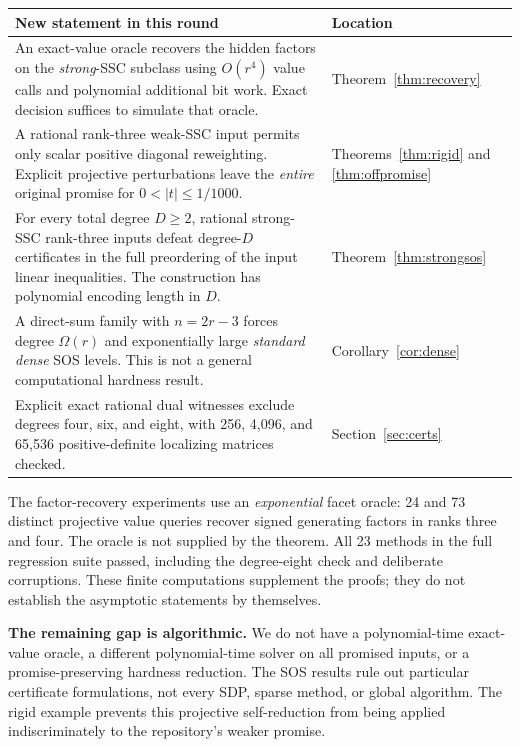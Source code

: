 \documentclass[11pt]{article}
\theoremstyle{definition}\newtheorem{definition}[theorem]{Definition}
\begin{document}
\begin{center}
\begin{tabular}{p{}p{}}
\toprule
\textbf{New statement in this round} & \textbf{Location}\\
\midrule
An exact-value oracle recovers the hidden factors on the \emph{strong}-SSC subclass using $O(r^4)$ value calls and polynomial additional bit work. Exact decision suffices to simulate that oracle. & Theorem~\ref{thm:recovery}\\[5pt]
A rational rank-three weak-SSC input permits only scalar positive diagonal reweighting. Explicit projective perturbations leave the \emph{entire} original promise for $0<|t|\le1/1000$. & Theorems~\ref{thm:rigid} and \ref{thm:offpromise}\\[5pt]
For every total degree $D\ge2$, rational strong-SSC rank-three inputs defeat degree-$D$ certificates in the full preordering of the input linear inequalities. The construction has polynomial encoding length in $D$. & Theorem~\ref{thm:strongsos}\\[5pt]
A direct-sum family with $n=2r-3$ forces degree $\Omega(r)$ and exponentially large \emph{standard dense} SOS levels. This is not a general computational hardness result. & Corollary~\ref{cor:dense}\\[5pt]
Explicit exact rational dual witnesses exclude degrees four, six, and eight, with 256, 4,096, and 65,536 positive-definite localizing matrices checked. & Section~\ref{sec:certs}\\
\bottomrule
\end{tabular}
\end{center}

The factor-recovery experiments use an \emph{exponential} facet oracle: 24 and 73 distinct projective value queries recover signed generating factors in ranks three and four. The oracle is not supplied by the theorem. All 23 methods in the full regression suite passed, including the degree-eight check and deliberate corruptions. These finite computations supplement the proofs; they do not establish the asymptotic statements by themselves.

\textbf{The remaining gap is algorithmic.} We do not have a polynomial-time exact-value oracle, a different polynomial-time solver on all promised inputs, or a promise-preserving hardness reduction. The SOS results rule out particular certificate formulations, not every SDP, sparse method, or global algorithm. The rigid example prevents this projective self-reduction from being applied indiscriminately to the repository's weaker promise.
\end{document}
